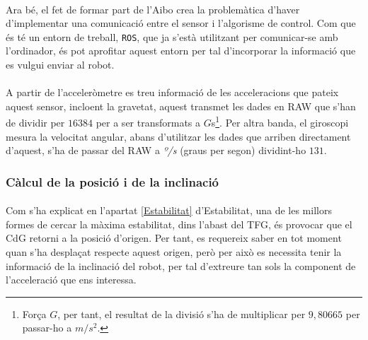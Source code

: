 \documentclass[12pt,a4paper,final,twoside]{article}
\begin{document}

\paragraph{}Ara bé, el fet de formar part de l'Aibo crea la problemàtica d'haver d'implementar una comunicació entre el sensor i l'algorisme de control. Com que és té un entorn de treball, \texttt{ROS}, que ja s'està utilitzant per comunicar-se amb l'ordinador, és pot aprofitar aquest entorn per tal d'incorporar la informació que es vulgui enviar al robot. 

\paragraph{}A partir de l'acceleròmetre es treu informació de les acceleracions que pateix aquest sensor, incloent la gravetat, aquest transmet les dades en RAW que s'han de dividir per $16384$ per a ser transformats a $G$s\footnote{Força $G$, per tant, el resultat de la divisió s'ha de multiplicar per $9,80665$ per passar-ho a $m/s^2$.}. Per altra banda, el giroscopi mesura la velocitat angular, abans d'utilitzar les dades que arriben directament d'aquest, s'ha de passar del RAW a \textit{º/s} (graus per segon) dividint-ho $131$.

\subsubsection{Càlcul de la posició i de la inclinació}

\paragraph{}Com s'ha explicat en l'apartat \ref{Estabilitat} d'Estabilitat, una de les millors formes de cercar la màxima estabilitat, dins l'abast del TFG, és provocar que el CdG retorni a la posició d'origen. Per tant, es requereix saber en tot moment quan s'ha desplaçat respecte aquest origen, però per això es necessita tenir la informació de la inclinació del robot, per tal d'extreure tan sols la component de l'acceleració que ens interessa.
\end{document}
